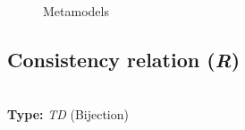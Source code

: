\documentclass{article}
\begin{document}
\begin{figure}[ht]
    \centering
    \mbox{\quad
          }
    \caption{Metamodels}
    \label{fig:Meta}
\end{figure}


\subsection{Consistency relation (\textit{R})}
\label{sec:CR}
~\\
\textbf{Type:} \textit{TD} (Bijection)\\
\end{document}
